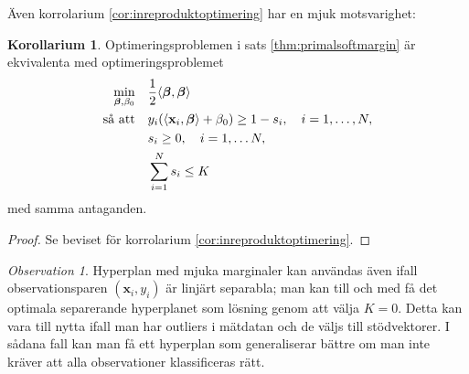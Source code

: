 \documentclass[a4paper, 12pt]{report}
\theoremstyle{definition}
\newtheorem{cor}[thm]{Korollarium}
\theoremstyle{remark}
\newtheorem*{rem}{Observation}
\newcommand{\bfbeta}{{\boldsymbol{\beta}}}
\begin{document}
Även korrolarium \ref{cor:inreproduktoptimering} har en mjuk motsvarighet:
\begin{cor}\label{cor:mjukinreproduktoptimering}
	Optimeringsproblemen i sats \ref{thm:primalsoftmargin} är ekvivalenta med optimeringsproblemet
	\begin{equation*}
	\begin{aligned}
	\operatornamewithlimits{min}_{\bfbeta,\beta_0} & & &\frac{1}{2}\langle \bfbeta, \bfbeta \rangle\\
	\text{så att} & & &y_i(\langle \mathbf{x}_i,\bfbeta\rangle+\beta_0)\geq 1 - s_i,\quad i=1,\dots,N,\\
	& & &s_i\geq0,\quad i=1,\dots N,\\
	& & &\sum_{i=1}^{N} s_i \leq K
	\end{aligned}
	\end{equation*}
	med samma antaganden.
\end{cor}
\begin{proof}
	Se beviset för korrolarium \ref{cor:inreproduktoptimering}.
\end{proof}

\begin{rem}
	Hyperplan med mjuka marginaler kan användas även ifall observationsparen $\left(\mathbf{x}_i,y_i\right)$ är linjärt separabla; man kan till och med få det optimala separerande hyperplanet som lösning genom att välja $K=0$. Detta kan vara till nytta ifall man har outliers i mätdatan och de väljs till stödvektorer. I sådana fall kan man få ett hyperplan som generaliserar bättre om man inte kräver att alla observationer klassificeras rätt.
\end{rem}
\end{document}
